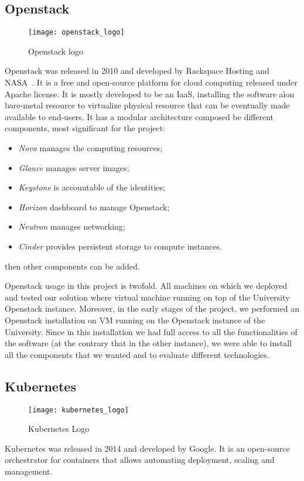 \subsection{Openstack}
\begin{figure}[t]
  \centering \texttt{[image: openstack\_logo]}
  \caption{Openstack logo}
  \label{chap:prjan:img:openstack_logo}
\end{figure}
Openstack was released in 2010 and developed by Rackspace Hosting and
NASA~\cite{openstackWebsite}. It is a free and open-source platform for cloud
computing released under Apache license. It is mostly developed to be an IaaS,
installing the software aìon bare-metal resource to virtualize physical resource
that can be eventually made available to end-users. It has a modular
architecture composed be different components, most significant for the project:
\begin{itemize}
\item \emph{Nova} manages the computing resources;
\item \emph{Glance} manages server images;
\item \emph{Keystone} is accountable of the identities;
\item \emph{Horizon} dashboard to manage Openstack;
\item \emph{Neutron} manages networking;
\item \emph{Cinder} provides persistent storage to compute instances.
\end{itemize}
then other components can be added.

Openstack usage in this project is twofold. All machines on which we deployed
and tested our solution where virtual machine running on top of the University
Openstack instance. Moreover, in the early stages of the project, we performed
an Openstack installation on VM running on the Openstack instance of
the University. Since in this installation we had full access to all the
functionalities of the software (at the contrary that in the other instance), we
were able to install all the components that we wanted and to evaluate different
technologies.


\subsection{Kubernetes}
\begin{figure}[h]
  \centering \texttt{[image: kubernetes\_logo]}
  \caption{Kubernetes Logo}
  \label{chap:intro:img:k8s_logo}
\end{figure}
Kubernetes was released in 2014 and developed by Google. It is an open-source
orchestrator for containers that allows automating deployment, scaling and
management.


